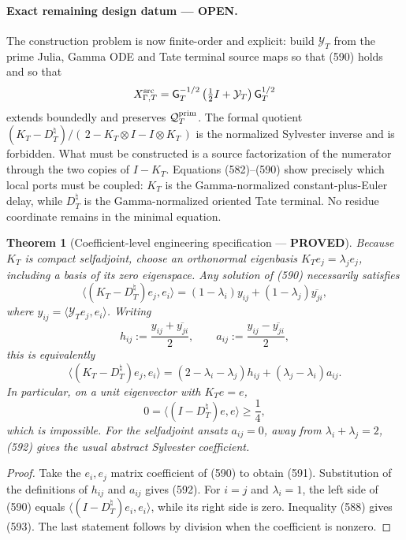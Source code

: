 \documentclass[11pt]{article}
\newtheorem{theorem}{Theorem}
\newcommand{\PROVED}{\textcolor{green!45!black}{\textbf{PROVED}}}
\newcommand{\OPEN}{\textcolor{red!70!black}{\textbf{OPEN}}}
\begin{document}
\paragraph{Exact remaining design datum --- \OPEN.}
The construction problem is now finite-order and explicit: build
\(\mathcal Y_T\) from the prime Julia, Gamma ODE and Tate terminal source
maps so that (590) holds and so that
\[
 X_{\Gamma,T}^{\rm src}
 =\mathsf G_T^{-1/2}
   \left(\tfrac12I+\mathcal Y_T\right)\mathsf G_T^{1/2}
\]
extends boundedly and preserves \(\mathcal Q_T^{\rm prim}\).
The formal quotient
\((K_T-D_T^\natural)/(\,2-K_T\otimes I-I\otimes K_T\,)\)
is the normalized Sylvester inverse and is forbidden.  What must be
constructed is a source factorization of the numerator through the two
copies of \(I-K_T\).  Equations (582)--(590) show precisely which local
ports must be coupled: \(K_T\) is the Gamma-normalized constant-plus-Euler
delay, while \(D_T^\natural\) is the Gamma-normalized oriented Tate
terminal.  No residue coordinate remains in the minimal equation.

\begin{theorem}[Coefficient-level engineering specification --- \PROVED]
Because \(K_T\) is compact selfadjoint, choose an orthonormal eigenbasis
\(K_Te_j=\lambda_je_j\), including a basis of its zero eigenspace.  Any
solution of (590) necessarily satisfies
\begin{equation}
 \langle(K_T-D_T^\natural)e_j,e_i\rangle
 =(1-\lambda_i)y_{ij}
  +(1-\lambda_j)\overline{y_{ji}},                    \tag{591}
\end{equation}
where \(y_{ij}=\langle\mathcal Y_Te_j,e_i\rangle\).
Writing
\[
 h_{ij}:=\frac{y_{ij}+\overline{y_{ji}}}{2},\qquad
 a_{ij}:=\frac{y_{ij}-\overline{y_{ji}}}{2},
\]
this is equivalently
\begin{equation}
 \langle(K_T-D_T^\natural)e_j,e_i\rangle
 =(2-\lambda_i-\lambda_j)h_{ij}
  +(\lambda_j-\lambda_i)a_{ij}.                       \tag{592}
\end{equation}
In particular, on a unit eigenvector with \(K_Te=e\),
\begin{equation}
 0=\langle(I-D_T^\natural)e,e\rangle\ge\frac14,       \tag{593}
\end{equation}
which is impossible.  For the selfadjoint ansatz \(a_{ij}=0\), away from
\(\lambda_i+\lambda_j=2\), (592) gives the usual abstract Sylvester
coefficient.
\end{theorem}

\begin{proof}
Take the \(e_i,e_j\) matrix coefficient of (590) to obtain (591).
Substitution of the definitions of \(h_{ij}\) and \(a_{ij}\) gives
(592).  For \(i=j\) and \(\lambda_i=1\), the left side of
(590) equals
\(\langle(I-D_T^\natural)e_i,e_i\rangle\), while its right side is zero.
Inequality (588) gives (593).  The last statement follows by division when
the coefficient is nonzero.
\end{proof}
\end{document}
